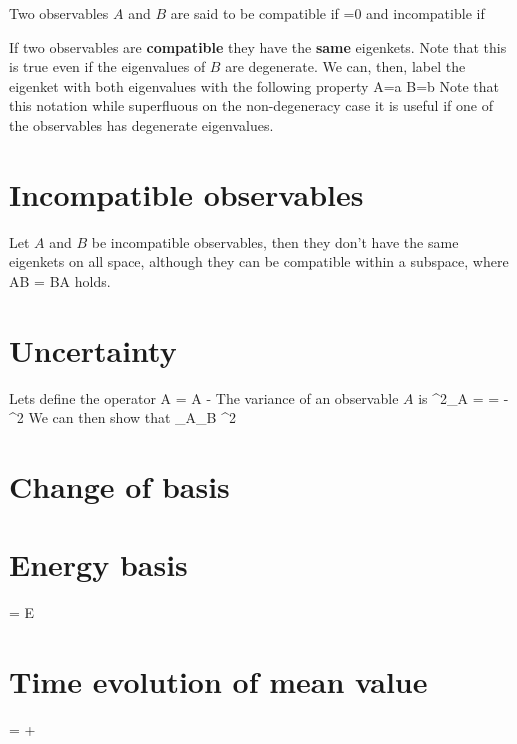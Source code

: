 \documentclass[oneside, 12pt, notitlepage]{book}
\begin{document}
Two observables \(A\) and \(B\) are said to be compatible if
\beq[eq:compatobs] =0 \eeq
and incompatible if
\beq[eq:incompatobs]   \eeq

If two observables are \textbf{compatible} they have the \textbf{same} eigenkets. Note that this is true even if the eigenvalues of \(B\) are degenerate. We can, then, label the eigenket with both eigenvalues
\beq {}\eeq
with the following property
\beq A=a\eeq
\beq B=b\eeq
Note that this notation while superfluous on the non-degeneracy case it is useful if one of the observables has degenerate eigenvalues.\par

\section{Incompatible observables}
Let \(A\) and \(B\) be incompatible observables, then they don't have the same eigenkets on all space, although they can be compatible within a subspace, where
\beq AB = BA\eeq
holds.\par

\section{Uncertainty}
Lets define the operator
\beq \Delta A = A - \eeq
The variance of an observable \(A\) is
\beq[eq:variancedef] \sigma^2_A =  =  - ^2\eeq
We can then show that
\beq[eq:uncertainty] \sigma_A\sigma_B \geq {}^2  \eeq

\section{Change of basis}

\section{Energy basis}

\beq[eq:TISE] \psi = E\psi \eeq



\section{Time evolution of mean value}

\beq[]  =  +  \eeq
\end{document}

